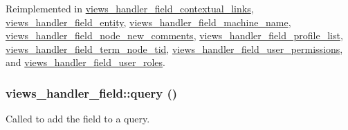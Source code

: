Reimplemented in \hyperlink{classviews__handler__field__contextual__links_a8ce76077c0fd83c38ebf52649a139d37}{views\_\-handler\_\-field\_\-contextual\_\-links}, \hyperlink{classviews__handler__field__entity_af42db39095ee851eb7cc34c8ea2e6beb}{views\_\-handler\_\-field\_\-entity}, \hyperlink{classviews__handler__field__machine__name_a59f0fefb006bc18fd3bd357df1fb75fa}{views\_\-handler\_\-field\_\-machine\_\-name}, \hyperlink{classviews__handler__field__node__new__comments_aa5442b95bd06e86ca293e30ae4ca96bb}{views\_\-handler\_\-field\_\-node\_\-new\_\-comments}, \hyperlink{classviews__handler__field__profile__list_a18beb938eb1e7839c96ed6d6e6600418}{views\_\-handler\_\-field\_\-profile\_\-list}, \hyperlink{classviews__handler__field__term__node__tid_a7e144b3fe39c483eea722484b87ff950}{views\_\-handler\_\-field\_\-term\_\-node\_\-tid}, \hyperlink{classviews__handler__field__user__permissions_a9c3969e0483e3d161e627e3d6ba5d78e}{views\_\-handler\_\-field\_\-user\_\-permissions}, and \hyperlink{classviews__handler__field__user__roles_a34b555f61da756e5494e923e8188d3d7}{views\_\-handler\_\-field\_\-user\_\-roles}.\hypertarget{classviews__handler__field_a4f661f91bcbe80d4a00c30a31456c502}{
\subsubsection[{query}]{\setlength{\rightskip}{0pt plus 5cm}views\_\-handler\_\-field::query ()}}
\label{classviews__handler__field_a4f661f91bcbe80d4a00c30a31456c502}
Called to add the field to a query. 

